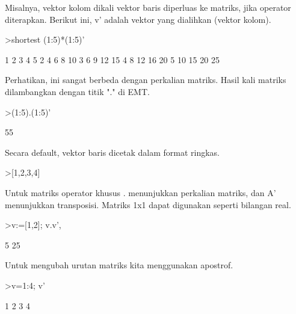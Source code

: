 \begin{eulernotebook}
\begin{eulercomment}
\begin{eulercomment}
\begin{eulercomment}
Misalnya, vektor kolom dikali vektor baris diperluas ke matriks, jika
operator diterapkan. Berikut ini, v' adalah vektor yang dialihkan
(vektor kolom).
\end{eulercomment}
\begin{eulerprompt}
>shortest (1:5)*(1:5)'
\end{eulerprompt}
\begin{euleroutput}
       1      2      3      4      5 
       2      4      6      8     10 
       3      6      9     12     15 
       4      8     12     16     20 
       5     10     15     20     25 
\end{euleroutput}
\begin{eulercomment}
Perhatikan, ini sangat berbeda dengan perkalian matriks. Hasil kali
matriks dilambangkan dengan titik "." di EMT.
\end{eulercomment}
\begin{eulerprompt}
>(1:5).(1:5)'
\end{eulerprompt}
\begin{euleroutput}
  55
\end{euleroutput}
\begin{eulercomment}
Secara default, vektor baris dicetak dalam format ringkas.
\end{eulercomment}
\begin{eulerprompt}
>[1,2,3,4]
\end{eulerprompt}
\begin{euleroutput}
  [1,  2,  3,  4]
\end{euleroutput}
\begin{eulercomment}
Untuk matriks operator khusus . menunjukkan perkalian matriks, dan A'
menunjukkan transposisi. Matriks 1x1 dapat digunakan seperti bilangan
real.
\end{eulercomment}
\begin{eulerprompt}
>v:=[1,2]; v.v', %
\end{eulerprompt}
\begin{euleroutput}
  5
  25
\end{euleroutput}
\begin{eulercomment}
Untuk mengubah urutan matriks kita menggunakan apostrof.
\end{eulercomment}
\begin{eulerprompt}
>v=1:4; v'
\end{eulerprompt}
\begin{euleroutput}
              1 
              2 
              3 
              4 
\end{euleroutput}

\end{eulercomment}
\end{eulercomment}
\end{eulernotebook}

